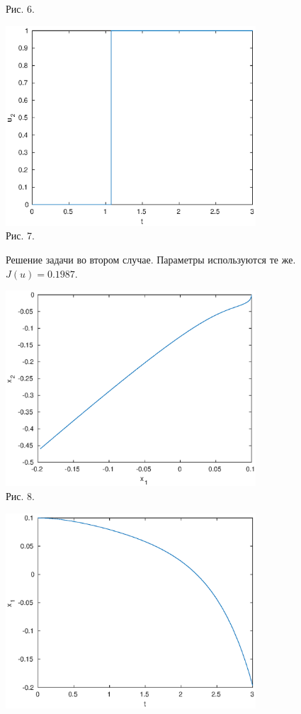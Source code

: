 \documentclass[11pt]{article}
\begin{document}
{{\begin{center}
	{Рис. 6. }
\end{center}
	\begin{center}
	\includegraphics[width=0.7\textwidth]{u2t.eps}\\
	{Рис. 7. }
\end{center}
\newpage
{Решение задачи во втором случае. Параметры используются те же. $J(u) = 0.1987.$}
\begin{center}
	\includegraphics[width=0.7\textwidth]{x1x2_1.eps}\\
	{Рис. 8. }
\end{center}
\begin{center}
	\includegraphics[width=0.7\textwidth]{x1t_1.eps}\\

\end{center}}}
\end{document}
